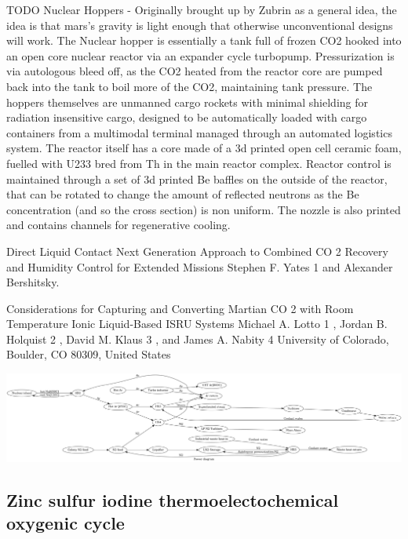 \documentclass[10pt]{article}
\begin{document}
TODO Nuclear Hoppers - Originally brought up by Zubrin as a general idea, the idea is that mars's gravity is light enough that otherwise unconventional designs will work. The Nuclear hopper is essentially a tank full of frozen CO2 hooked into an open core nuclear reactor via an expander cycle turbopump. Pressurization is via autologous bleed off, as the CO2 heated from the reactor core are pumped back into the tank to boil more of the CO2, maintaining tank pressure. The hoppers themselves are unmanned cargo rockets with minimal shielding for radiation insensitive cargo, designed to be automatically loaded with cargo containers from a multimodal terminal managed through an automated logistics system. The reactor itself has a core made of a 3d printed open cell ceramic foam, fuelled with U233 bred from Th in the main reactor complex. Reactor control is maintained through a set of 3d printed Be baffles on the outside of the reactor, that can be rotated to change the amount of reflected neutrons as the Be concentration (and so the cross section) is non uniform. The nozzle is also printed and contains channels for regenerative cooling.

Direct Liquid Contact  Next Generation Approach to
Combined CO 2 Recovery and Humidity Control for
Extended Missions
Stephen F. Yates 1 and Alexander Bershitsky.

Considerations for Capturing and Converting Martian CO 2
with Room Temperature Ionic Liquid-Based ISRU Systems
Michael A. Lotto 1 , Jordan B. Holquist 2 , David M. Klaus 3 , and James A. Nabity 4
University of Colorado, Boulder, CO 80309, United States

\includegraphics[width=1\textwidth]{fig_power.png}

\subsection*{Zinc sulfur iodine thermoelectochemical oxygenic cycle}
\end{document}
